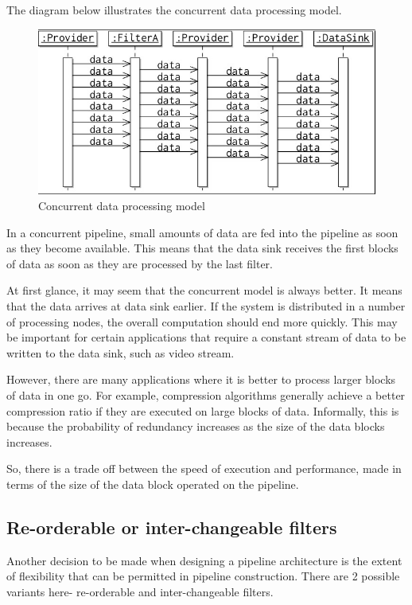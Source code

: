 \documentclass[a4paper, openany]{memoir}
\begin{document}
The diagram below illustrates the concurrent data processing model.
\begin{figure}[H]
    \centering
    \includegraphics[scale=0.45]{src/14.16 concurrent.png}
    \caption{Concurrent data processing model}
\end{figure}
\noindent In a concurrent pipeline, small amounts of data are fed into the pipeline as soon as they become available. This means that the data sink receives the first blocks of data as soon as they are processed by the last filter.

At first glance, it may seem that the concurrent model is always better. It means that the data arrives at data sink earlier. If the system is distributed in a number of processing nodes, the overall computation should end more quickly. This may be important for certain applications that require a constant stream of data to be written to the data sink, such as video stream.

However, there are many applications where it is better to process larger blocks of data in one go. For example, compression algorithms generally achieve a better compression ratio if they are executed on large blocks of data. Informally, this is because the probability of redundancy increases as the size of the data blocks increases. 

So, there is a trade off between the speed of execution and performance, made in terms of the size of the data block operated on the pipeline.

\subsection{Re-orderable or inter-changeable filters}
Another decision to be made when designing a pipeline architecture is the extent of flexibility that can be permitted in pipeline construction. There are 2 possible variants here- re-orderable and inter-changeable filters.
\end{document}
